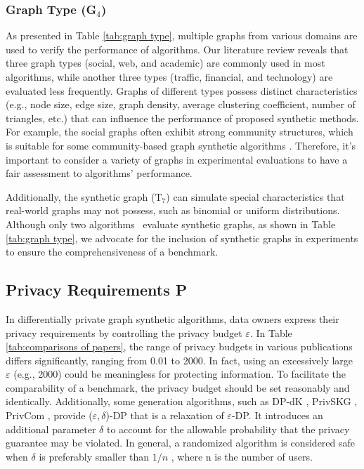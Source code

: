 \documentclass[conference]{IEEEtran}
\theoremstyle{plain}
\begin{document}
\subsubsection{Graph Type (\textbf{G$_4$})}
As presented in Table \ref{tab:graph type}, multiple graphs from various domains are used to verify the performance of algorithms. 
Our literature review reveals that three graph types (social, web, and academic) are commonly used in most algorithms, while another three types (traffic, financial, and technology) are evaluated less frequently.
Graphs of different types possess distinct characteristics (e.g., node size, edge size, graph density, average clustering coefficient, number of triangles, etc.) that can influence the performance of proposed synthetic methods. 
For example, the social graphs often exhibit strong community structures, which is suitable for some community-based graph synthetic algorithms \cite{yuan2023privgraph,ju2019generating,chen2019publishing,liu2020local}. Therefore, it's important to consider a variety of graphs in experimental evaluations to have a fair assessment to algorithms' performance.

Additionally, the synthetic graph (${\text{T}_7}$) can simulate special characteristics that real-world graphs may not possess, such as binomial or uniform distributions. Although only two algorithms~\cite{mir2012differentially,jian2021publishing} evaluate synthetic graphs, as shown in Table \ref{tab:graph type}, we advocate for the inclusion of synthetic graphs in experiments to ensure the comprehensiveness of a benchmark.

\subsection{Privacy Requirements \textbf{P}}
In differentially private graph synthetic algorithms, data owners express their privacy requirements by controlling the privacy budget $\varepsilon$. 
In Table \ref{tab:comparisons of papers}, the range of privacy budgets in various publications differs significantly, ranging from 0.01 to 2000. 
In fact, using an excessively large $\varepsilon$ (e.g., 2000) could be meaningless for protecting information.
To facilitate the comparability of a benchmark, the privacy budget should be set reasonably and identically.
Additionally, some generation algorithms, such as DP-dK \cite{wang2013preserving}, PrivSKG \cite{mir2012differentially}, PrivCom \cite{zhang2020community}, provide ($\varepsilon,\delta$)-DP that is a relaxation of $\varepsilon$-DP.
It introduces an additional parameter $\delta$ to account for the allowable probability that the privacy guarantee may be violated.
In general, a randomized algorithm is considered safe when $\delta$ is preferably smaller than $1/n$ \cite{dwork2006our,abadi2016deep}, where n is the number of users.
\end{document}
